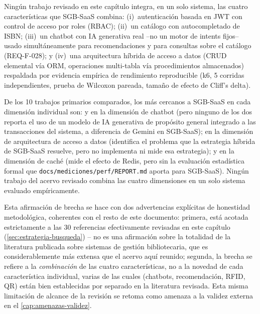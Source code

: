 Ningún trabajo revisado en este capítulo integra, en un solo sistema,
las cuatro características que SGB-SaaS combina: (i)~autenticación
basada en JWT con control de acceso por roles (RBAC); (ii)~un catálogo
con autocompletado de ISBN; (iii)~un chatbot con IA generativa real --no
un motor de intents fijos-- usado simultáneamente para recomendaciones y
para consultas sobre el catálogo (REQ-F-028); y (iv)~una arquitectura
híbrida de acceso a datos (CRUD elemental vía ORM, operaciones
multi-tabla vía procedimientos almacenados) respaldada por evidencia
empírica de rendimiento reproducible (k6, 5 corridas independientes,
prueba de Wilcoxon pareada, tamaño de efecto de Cliff's delta).

De los 10 trabajos primarios comparados, los más cercanos a SGB-SaaS en
cada dimensión individual son: \citet{ng2024libbot} y
\citet{ehrenpreis2022chatbot} en la dimensión de chatbot (pero ninguno
de los dos reporta el uso de un modelo de IA generativa de propósito
general integrado a las transacciones del sistema, a diferencia de
Gemini en SGB-SaaS); \citet{colley2018ormperformance} en la dimensión de
arquitectura de acceso a datos (identifica el problema que la estrategia
híbrida de SGB-SaaS resuelve, pero no implementa ni mide esa estrategia);
y \citet{kusuma2017rediscaching} en la dimensión de caché (mide el
efecto de Redis, pero sin la evaluación estadística formal que
\texttt{docs/mediciones/perf/REPORT.md} aporta para SGB-SaaS). Ningún
trabajo del acervo revisado combina las cuatro dimensiones en un solo
sistema evaluado empíricamente.

Esta afirmación de brecha se hace con dos advertencias explícitas de
honestidad metodológica, coherentes con el resto de este documento:
primera, está acotada estrictamente a las 30 referencias efectivamente
revisadas en este capítulo (\autoref{sec:estrategia-busqueda}) -- no es
una afirmación sobre la totalidad de la literatura publicada sobre
sistemas de gestión bibliotecaria, que es considerablemente más extensa
que el acervo aquí reunido; segunda, la brecha se refiere a la
\emph{combinación} de las cuatro características, no a la novedad de
cada característica individual, varias de las cuales (chatbots,
recomendación, RFID, QR) están bien establecidas por separado en la
literatura revisada. Esta misma limitación de alcance de la revisión se
retoma como amenaza a la validez externa en el
\autoref{cap:amenazas-validez}.
